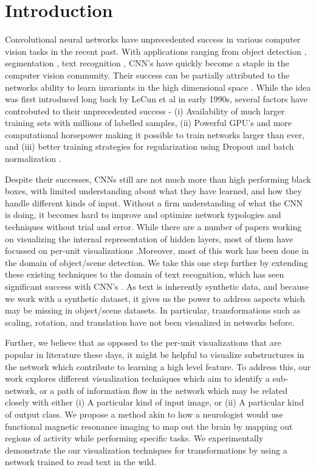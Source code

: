 \documentclass[10pt,twocolumn,letterpaper]{article}
\begin{document}
\section{Introduction}
Convolutional neural networks have unprecedented success in various computer vision tasks in the recent past.  With applications ranging from object detection \cite{}, segmentation \cite{}, text recognition \cite{}, CNN's have quickly become a staple in the computer vision community. Their success can be partially attributed to the networks ability to learn invariants in the high dimensional space \cite{}. While the idea was first introduced long back by LeCun et al in early 1990s, several factors have controbuted to their unprecedented success - (i) Availability of much larger training sets with millions of labelled samples, (ii) Powerful GPU's and more computational horsepower making it possible to train networks larger than ever, and (iii) better training strategies for regularization using Dropout \cite{wan2013regularization} and batch normalization \cite{ioffe2015batch}.


Despite their successes, CNNs still are not much more than high performing black boxes, with limited understanding about what they have learned, and how they handle different kinds of input. Without a firm understanding of what the CNN is doing, it becomes hard to improve and optimize network typologies and techniques without trial and error. While there are a number of papers working on visualizing the internal representation of hidden layers, most of them have focussed on per-unit visualizations \cite{yosinski2015understanding,mahendran2015understanding,zhou2014object}.Moreover, most of this work has been done in the domain of object/scene detection. We take this one step further by extending these existing techniques to the domain of text recognition, which has seen significant success with CNN's \cite{Jaderberg14,Jaderberg14c,Jaderberg14d}. As text is inherently synthetic data, and because we work with a synthetic dataset, it gives us the power to address aspects which may be missing in object/scene datasets. In particular, transformations such as scaling, rotation, and translation have not been visualized in networks before.


Further, we believe that as opposed to the per-unit visualizations that are popular in literature these days, it might be helpful to visualize substructures in the network which contribute to learning a high level feature. To address this, our work explores different visualization techniques which aim to identify a sub-network, or a path of information flow in the network which may be related closely with either (i) A particular kind of input image, or (ii) A particular kind of output class. We propose a method akin to how a neurologist would use functional magnetic resonance imaging to map out the brain by mapping out regions of activity while performing specific tasks.\cite{friston1998event} We experimentally demonstrate the our visualization techniques for transformations by using a network trained to read text in the wild.
\end{document}
